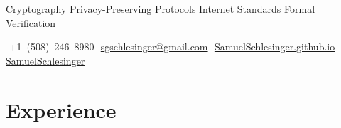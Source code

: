 \documentclass[10pt, letterpaper]{article}
\newcommand{\sep}{\hspace{0.7em}{\color{rule}|}\hspace{0.7em}}
\begin{document}
\begin{center}
  {\fontsize{26}{28}\selectfont{}}\par
  \vspace{0.35em}
  {\color{muted}\small Cryptography\,\textperiodcentered\,Privacy-Preserving Protocols\,\textperiodcentered\,Internet Standards\,\textperiodcentered\,Formal Verification}\par
  \vspace{0.45em}
  {\small
    \faPhone*\,\,+1~(508)~246~8980\sep
    \faEnvelope[regular]\,\,\href{mailto:sgschlesinger@gmail.com}{sgschlesinger@gmail.com}\sep
    \faGlobe\,\,\href{https://SamuelSchlesinger.github.io}{SamuelSchlesinger.github.io}\sep
    \faGithub\,\,\href{https://github.com/SamuelSchlesinger}{SamuelSchlesinger}}
\end{center}
\vspace{-0.6em}

\section{Experience}
\end{document}
